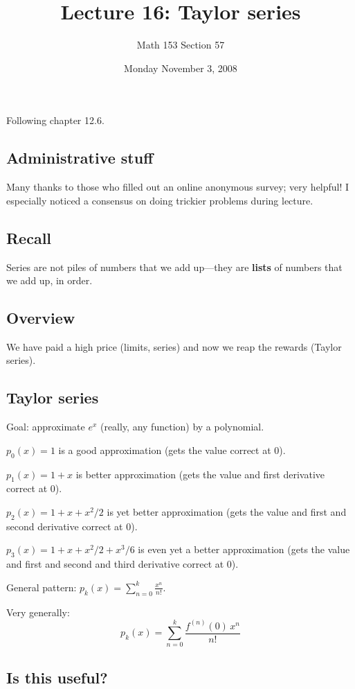 \documentclass[12pt]{article}
\title{Lecture 16: Taylor series}
\author{Math 153 Section 57}
\date{Monday November  3, 2008}
\begin{document}
\maketitle

Following chapter 12.6.

\subsection{Administrative stuff}

Many thanks to those who filled out an online anonymous survey; very
helpful!  I especially noticed a consensus on doing trickier problems
during lecture.

\subsection{Recall}

Series are not piles of numbers that we add up---they are
\textbf{lists} of numbers that we add up, in order.

\subsection{Overview}

We have paid a high price (limits, series) and now we reap the rewards
(Taylor series).

\subsection{Taylor series}

Goal: approximate $e^x$ (really, any function) by a polynomial.

$p_0(x) = 1$ is a good approximation (gets the value correct at 0).

$p_1(x) = 1 + x$ is better approximation (gets the value and first derivative correct at 0).

$p_2(x) = 1 + x + x^2/2$ is yet better approximation (gets the value and first and second derivative correct at 0).

$p_3(x) = 1 + x + x^2/2 + x^3/6$ is even yet a better approximation (gets the value and first and second and third derivative correct at 0).

General pattern: $p_k(x) = \sum_{n=0}^k \frac{x^n}{n!}$.

Very generally:
$$
p_k(x) = \sum_{n=0}^k \frac{f^{(n)}(0) \, x^n}{n!}
$$

\subsection{Is this useful?}
\end{document}
